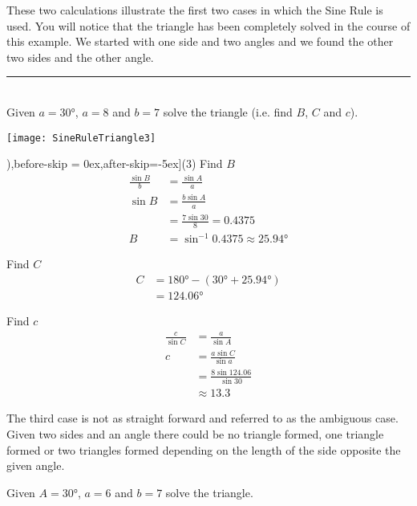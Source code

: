 These two calculations illustrate the first two cases in which the Sine Rule is used. You will notice that the triangle has been completely solved in the course of this example. We started with one side and two angles and we found the other two sides and the other angle. \\
\rule{6.8cm}{0.5pt}\\
\example Given $a =\ang{30} $, $a =8$ and $b =7$ solve the triangle (i.e. find $B$, $C$ and $c$). \\
\begin{center}
	\texttt{[image: SineRuleTriangle3]}\\
\end{center}
\solution
\begin{tasks}[counter-format=(tsk[1]),before-skip = {0ex},after-skip={-5ex}](3)
\task Find $B$
\begin{align*}\frac{\sin  B}{b} &  = \frac{\sin  A}{a} \\
\sin  B &  = \frac{b \sin  A}{a} \\
&  = \frac{7 \sin  30 }{8} =0.4375 \\
B &  = \sin ^{ -1} 0.4375 \approx \ang{25.94} \end{align*}

\task Find $C$
\begin{align*}C &  = \ang{180}  -(\ang{30}  +\ang{25.94} ) \\
&  = \ang{124.06} \end{align*}

\task Find $c$
\begin{align*}\frac{c}{\sin  C} &  = \frac{a}{\sin  A} \\
c &  = \frac{a \sin  C}{\sin a} \\
&  = \frac{8 \sin  124.06 }{\sin  30 } \\
&  \approx   13.3\end{align*}
\end{tasks}
The third case is not as straight forward and referred to as the ambiguous case. Given two sides and an angle there could be no triangle formed, one triangle formed or two triangles formed depending on the length of the side opposite the given angle.

 Given $A =\ang{30} $, $a =6$ and $b =7$ solve the triangle. \\

